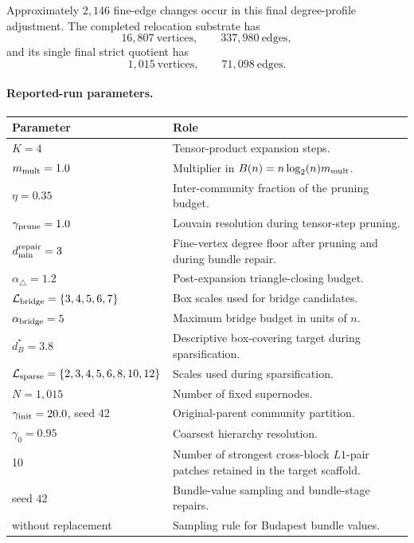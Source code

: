 \documentclass[12pt]{article}
\begin{document}
Approximately \(2{,}146\) fine-edge changes occur in this final degree-profile
adjustment.  The completed relocation substrate has
\[
16{,}807\ \text{vertices},\qquad337{,}980\ \text{edges},
\]
and its single final strict quotient has
\[
1{,}015\ \text{vertices},\qquad71{,}098\ \text{edges}.
\]

\paragraph{Reported-run parameters.}
\begin{table}[H]
\centering
\small
\setlength{\tabcolsep}{4pt}
\begin{tabularx}{\textwidth}{p{}X}
\toprule
Parameter & Role \\
\midrule
\(K=4\) & Tensor-product expansion steps. \\
\(m_{\rm mult}=1.0\) & Multiplier in \(B(n)=n\log_2(n)m_{\rm mult}\). \\
\(\eta=0.35\) & Inter-community fraction of the pruning budget. \\
\(\gamma_{\rm prune}=1.0\) & Louvain resolution during tensor-step pruning. \\
\(d_{\min}^{\rm repair}=3\) & Fine-vertex degree floor after pruning and during bundle repair. \\
\(\alpha_{\triangle}=1.2\) & Post-expansion triangle-closing budget. \\
\(\mathcal L_{\rm bridge}=\{3,4,5,6,7\}\) & Box scales used for bridge candidates. \\
\(\alpha_{\rm bridge}=5\) & Maximum bridge budget in units of \(n\). \\
\(d_B^*=3.8\) & Descriptive box-covering target during sparsification. \\
\(\mathcal L_{\rm sparse}=\{2,3,4,5,6,8,10,12\}\) & Scales used during sparsification. \\
\(N=1{,}015\) & Number of fixed supernodes. \\
\(\gamma_{\rm init}=20.0\), seed \(42\) & Original-parent community partition. \\
\(\gamma_0=0.95\) & Coarsest hierarchy resolution. \\
10 & Number of strongest cross-block \(L1\)-pair patches retained in the target scaffold. \\
seed \(42\) & Bundle-value sampling and bundle-stage repairs. \\
without replacement & Sampling rule for Budapest bundle values. \\

\end{tabularx}
\end{table}
\end{document}
